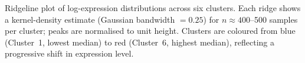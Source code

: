 \caption{Ridgeline plot of log-expression distributions across six clusters.
Each ridge shows a kernel-density estimate (Gaussian bandwidth $= 0.25$)
for $n \approx 400$--500 samples per cluster; peaks are normalised to unit height.
Clusters are coloured from blue (Cluster~1, lowest median) to red (Cluster~6,
highest median), reflecting a progressive shift in expression level.}
